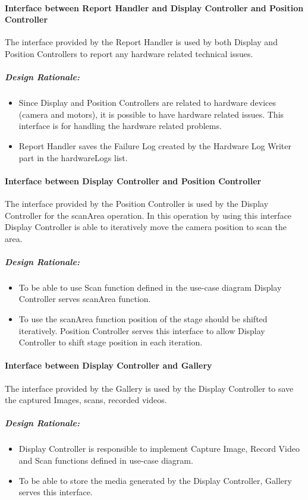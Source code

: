 \paragraph{Interface between Report Handler and Display Controller and Position Controller}
The interface provided by the Report Handler is used by both Display and Position Controllers to report any hardware related technical issues.
\subparagraph{Design Rationale:}
\begin{itemize}
	\item Since Display and Position Controllers are related to hardware devices (camera and motors), it is possible to have hardware related issues. This interface is for handling the hardware related problems.
	\item Report Handler saves the Failure Log created by the Hardware Log Writer part in the hardwareLogs list. 
\end{itemize}
\paragraph{Interface between Display Controller and Position Controller}
The interface provided by the Position Controller is used by the Display Controller for the scanArea operation. In this operation by using this interface Display Controller is able to iteratively move the camera position to scan the area.
\subparagraph{Design Rationale:}
\begin{itemize}
	\item To be able to use Scan function defined in the use-case diagram Display Controller serves scanArea function.
	\item To use the scanArea function position of the stage should be shifted iteratively. Position Controller serves this interface to allow Display Controller to shift stage position in each iteration.
\end{itemize}
\paragraph{Interface between Display Controller and Gallery}
The interface provided by the Gallery is used by the Display Controller to save the captured Images, scans, recorded videos.
\subparagraph{Design Rationale:}
\begin{itemize}
	\item Display Controller is responsible to implement Capture Image, Record Video and Scan functions defined in use-case diagram.
	\item To be able to store the media generated by the Display Controller, Gallery serves this interface.
\end{itemize}
